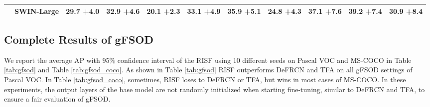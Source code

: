 \documentclass{article}
\begin{document}
\begin{table}[h]
\begin{adjustbox}{width=1.0\textwidth}
{\begin{tabular}{c|l|ccc|ccc|ccc}
     &SWIN-Large\cite{swin}&29.7 {\scriptsize \color{red}+4.0}&32.9 {\scriptsize \color{red}+4.6}&20.1 {\scriptsize \color{red}+2.3}&33.1 {\scriptsize \color{red}+4.9}&35.9 {\scriptsize \color{red}+5.1}&24.8 {\scriptsize \color{red}+4.3}&37.1 {\scriptsize \color{red}+7.6}&39.2 {\scriptsize \color{red}+7.4}&30.9 {\scriptsize \color{red}+8.4}\\
     \bottomrule
\end{tabular}
}
\end{adjustbox}
\label{tab:backbone}
\end{table}

\subsection{Complete Results of gFSOD}

We report the average AP with 95\% confidence interval of the RISF using 10 different seeds on Pascal VOC and MS-COCO in Table \ref{tab:gfsod} and Table \ref{tab:gfsod_coco}.
As shown in Table \ref{tab:gfsod} RISF outperforms DeFRCN and TFA on all gFSOD settings of Pascal VOC.
In Table \ref{tab:gfsod_coco}, sometimes, RISF loses to DeFRCN or TFA, but wins in most cases of MS-COCO.
In these experiments, the output layers of the base model are not randomly initialized when starting fine-tuning, similar to DeFRCN and TFA, to ensure a fair evaluation of gFSOD.
\end{document}
